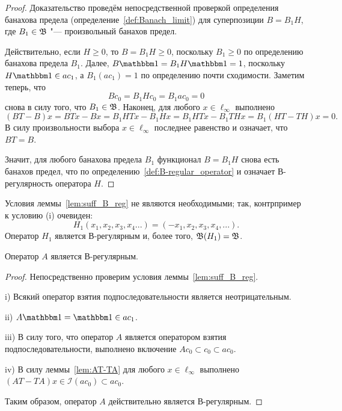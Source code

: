 \begin{proof}
	Доказательство проведём непосредственной проверкой определения банахова предела
	(определение~\ref{def:Banach_limit})
	для суперпозиции $B = B_1 H$,
	где $B_1 \in \mathfrak{B}$ "--- произвольный банахов предел.

	Действительно, если $H\geq 0$, то $B = B_1 H \geq 0$,
	поскольку $B_1 \geq 0$ по определению банахова предела $B_1$.
	Далее, $B\one = B_1 H \one = 1$, поскольку $H\one \in ac_1$,
	а $B_1(ac_1) = 1$ по определению почти сходимости.
	Заметим теперь, что
	\begin{equation}
		Bc_0 = B_1 H c_0 = B_1 ac_0 = 0
	\end{equation}
	снова в силу того, что $B_1\in\mathfrak{B}$.
	Наконец, для любого $x\in\ell_\infty$ выполнено
	\begin{equation}
		(BT-B)x = BTx - Bx = B_1 HTx - B_1 H x = B_1 HTx - B_1 T H x = B_1 (HT -  T H) x = 0
		.
	\end{equation}
	В силу произвольности выбора $x\in \ell_\infty$ последнее равенство и означает, что $BT=B$.

	Значит, для любого банахова предела $B_1$ функционал $B=B_1 H$ снова есть банахов предел,
	что по определению~\ref{def:B-regular_operator}
	и означает В-регулярность оператора $H$.
\end{proof}

\begin{remark}
	Условия леммы~\ref{lem:suff_B_reg} не являются необходимыми;
	так, контрпример к условию (i) очевиден:
	\begin{equation}
		H_1(x_1,x_2,x_3,x_4...) = (-x_1, x_2, x_3, x_4, ...)
		.
	\end{equation}
	Оператор $H_1$ является В-регулярным и, более того, $\mathfrak{B}(H_1) = \mathfrak{B}$.
\end{remark}


\begin{theorem}
	\label{thm:A_block_thrower_is_B-regular}
	Оператор $A$ является В-регулярным.
\end{theorem}

\begin{proof}
	Непосредственно проверим условия леммы~\ref{lem:suff_B_reg}.

	i) Всякий оператор взятия подпоследовательности является неотрицательным.

	ii) $A\one = \one \in ac_1$.

	iii)  В силу того, что оператор $A$ является оператором взятия подпоследовательности,
	выполнено включение $Ac_0 \subset c_0 \subset ac_0$.

	iv) В силу леммы~\ref{lem:AT-TA} для любого $x\in \ell_\infty$ выполнено $(AT-TA)x \in \mathcal{I}(ac_0) \subset ac_0$.

	Таким образом, оператор $A$ действительно является В-регулярным.
\end{proof}

